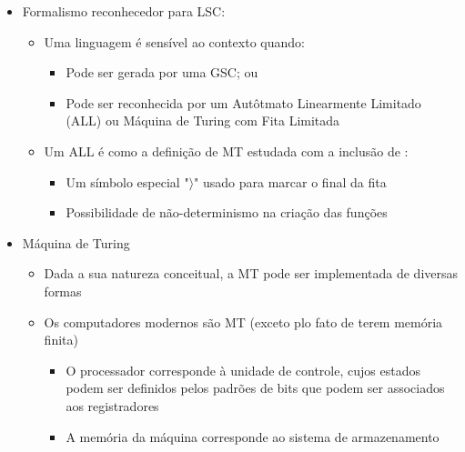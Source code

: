 \documentclass[12pt]{article}
\begin{document}
\begin{itemize}
\begin{itemize}
\begin{itemize}
            \begin{itemize}
                \item Encontrar o caminho mais curto que visita todos os pontos 
                em um conjunto dado de pontos e retorna ao ponto de origem. 
                Embora existam algoritmos que podem encontrar soluções 
                aproximadas, encontrar a solução exata para grandes conjuntos 
                de pontos é computacionalmente inviável em um tempo razoável
            \end{itemize}
        \end{itemize}
    \end{itemize}
    \item Formalismo reconhecedor para LSC:
    \begin{itemize}
        \item Uma linguagem é sensível ao contexto quando:
        \begin{itemize}
            \item Pode ser gerada por uma GSC; ou
            \item Pode ser reconhecida por um Autôtmato Linearmente Limitado 
            (ALL) ou Máquina de Turing com Fita Limitada
        \end{itemize}
        \item Um ALL é como a definição de MT estudada com a inclusão de :
        \begin{itemize}
            \item Um símbolo especial "$\rangle$" usado para marcar o final da 
            fita
            \item Possibilidade de não-determinismo na criação das funções
        \end{itemize}
    \end{itemize}
    \item Máquina de Turing
    \begin{itemize}
        \item Dada a sua natureza conceitual, a MT pode ser implementada de 
        diversas formas
        \item Os computadores modernos são MT (exceto plo fato de terem memória 
        finita)
        \begin{itemize}
            \item O processador corresponde à unidade de controle, cujos estados 
            podem ser definidos pelos padrões de bits que podem ser associados 
            aos registradores
            \item A memória da máquina corresponde ao sistema de armazenamento 

\end{itemize}
\end{itemize}
\end{itemize}
\end{document}
